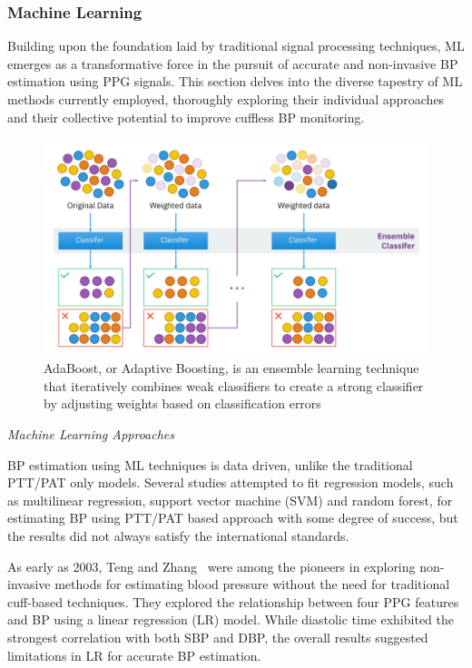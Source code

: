 \subsubsection{Machine Learning}
\label{subsubsec:machine_learning}

Building upon the foundation laid by traditional signal processing techniques, ML emerges as a transformative force in the pursuit of accurate and non-invasive BP estimation using PPG signals.
This section delves into the diverse tapestry of ML methods currently employed, thoroughly exploring their individual approaches and their collective potential to improve cuffless BP monitoring.

\begin{figure}[h]
    \centering
    \includegraphics[scale=0.06]{images/ml/adaboost}
    \caption{\small AdaBoost, or Adaptive Boosting, is an ensemble learning technique that iteratively combines weak classifiers to create a strong classifier by adjusting weights based on classification errors~\cite{AdaBoostAlgorithmMachine}}
    \label{fig:adaboost}
\end{figure}

\vspace{0.2cm}
\textit{Machine Learning Approaches}
\vspace{0.2cm}

BP estimation using ML techniques is data driven, unlike the traditional PTT/PAT only models.
Several studies attempted to fit regression models, such as multilinear regression, support vector machine (SVM) and random forest, for estimating BP using PTT/PAT based approach with some degree of success, but the results did not always satisfy the international standards.

As early as 2003, Teng and Zhang~\cite{tengContinuousNoninvasiveEstimation2003} were among the pioneers in exploring non-invasive methods for estimating blood pressure without the need for traditional cuff-based techniques.
They explored the relationship between four PPG features and BP using a linear regression (LR) model.
While diastolic time exhibited the strongest correlation with both SBP and DBP, the overall results suggested limitations in LR for accurate BP estimation.

